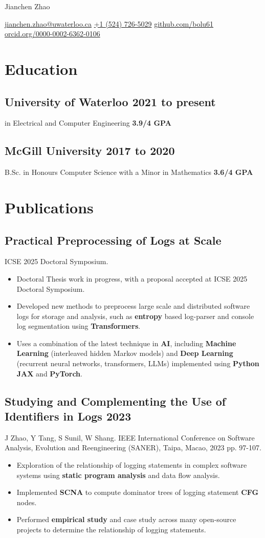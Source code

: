 \documentclass[10pt,letterpaper]{article}
\newcommand{\datedsubsection}[2]{\subsection[#1]{#1 \hfill #2}}
\newcommand{\name}[1]{\centerline{\Huge{#1}}}
\newcommand{\contact}[1]{\centerline{#1}}
\newcommand{\sep}{{\large\textperiodcentered}}
\renewcommand{\emph}[1]{{\color{emphcolor}\bfseries#1}}
\begin{document}
\name{Jianchen Zhao}
\contact{\href{mailto:jianchen.zhao@uwaterloo.ca}{jianchen.zhao@uwaterloo.ca} \sep{} \href{tel:+15147265029}{+1 (524) 726-5029} \sep{} \href{https://github.com/bolu61}{github.com/bolu61} \sep{} \href{https://orcid.org/0000-0002-6362-0106}{orcid.org/0000-0002-6362-0106}}

\section{Education}

\datedsubsection{\emph{University of Waterloo}}{2021 to present}
\noindent \emph{Ph.D.} in Electrical and Computer Engineering \emph{3.9/4 GPA}

\datedsubsection{\emph{McGill University}}{2017 to 2020}
\noindent B.Sc. in Honours Computer Science with a Minor in Mathematics \emph{3.6/4 GPA}

\section{Publications}

\subsection{Practical Preprocessing of Logs at Scale}
\noindent ICSE 2025 Doctoral Symposium.
\begin{itemize}
    \item Doctoral Thesis work in progress, with a proposal accepted at ICSE 2025 Doctoral Symposium.
    \item Developed new methods to preprocess large scale and distributed
    software logs for storage and analysis, such as \emph{entropy} based
    log-parser and console log segmentation using \emph{Transformers}.
    \item Uses a combination of the latest technique in \emph{AI}, including
    \emph{Machine Learning} (interleaved hidden Markov models) and \emph{Deep
    Learning} (recurrent neural networks, transformers, LLMs) implemented using
    \emph{Python} \emph{JAX} and \emph{PyTorch}.
\end{itemize}

\datedsubsection{Studying and Complementing the Use of Identifiers in Logs}{2023}
\noindent J Zhao, Y Tang, S Sunil, W Shang. IEEE International Conference on Software Analysis, Evolution and Reengineering (SANER), Taipa, Macao,
2023 pp. 97-107.
\begin{itemize}
    \item Exploration of the relationship of logging statements in complex
    software systems using \emph{static program analysis} and data flow analysis.
    \item Implemented \emph{SCNA} to compute dominator trees of logging statement \emph{CFG} nodes.
    \item Performed \emph{empirical study} and case study across many open-source
    projects to determine the relationship of logging statements.
\end{itemize}
\end{document}
